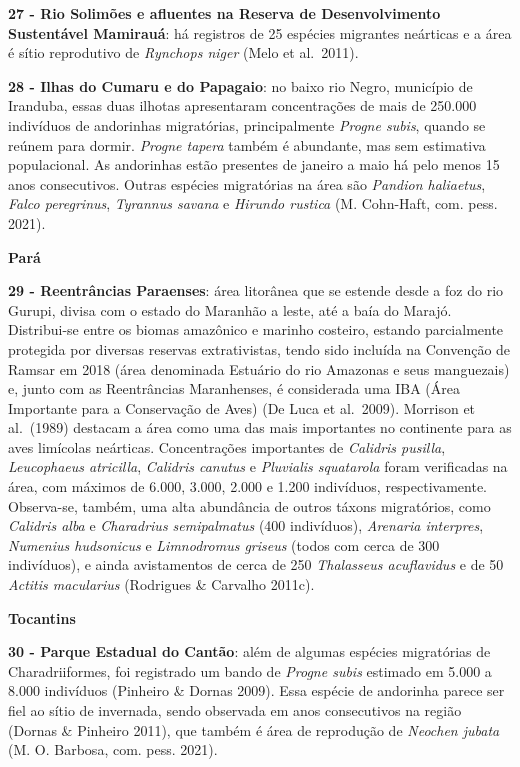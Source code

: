 \documentclass[
  oneside]{scrbook}
\begin{document}
\textbf{27 - Rio Solimões e afluentes na Reserva de Desenvolvimento Sustentável Mamirauá}: há registros de 25 espécies migrantes neárticas e a área é sítio reprodutivo de \emph{Rynchops niger} (Melo et al.~2011).

\textbf{28 - Ilhas do Cumaru e do Papagaio}: no baixo rio Negro, município de Iranduba, essas duas ilhotas apresentaram concentrações de mais de 250.000 indivíduos de andorinhas migratórias, principalmente \emph{Progne subis}, quando se reúnem para dormir. \emph{Progne tapera} também é abundante, mas sem estimativa populacional. As andorinhas estão presentes de janeiro a maio há pelo menos 15 anos consecutivos. Outras espécies migratórias na área são \emph{Pandion haliaetus}, \emph{Falco peregrinus}, \emph{Tyrannus savana} e \emph{Hirundo rustica} (M. Cohn-Haft, com. pess. 2021).

\textbf{Pará}

\textbf{29 - Reentrâncias Paraenses}: área litorânea que se estende desde a foz do rio Gurupi, divisa com o estado do Maranhão a leste, até a baía do Marajó. Distribui-se entre os biomas amazônico e marinho costeiro, estando parcialmente protegida por diversas reservas extrativistas, tendo sido incluída na Convenção de Ramsar em 2018 (área denominada Estuário do rio Amazonas e seus manguezais) e, junto com as Reentrâncias Maranhenses, é considerada uma IBA (Área Importante para a Conservação de Aves) (De Luca et al.~2009). Morrison et al.~(1989) destacam a área como uma das mais importantes no continente para as aves limícolas neárticas. Concentrações importantes de \emph{Calidris pusilla}, \emph{Leucophaeus atricilla}, \emph{Calidris canutus} e \emph{Pluvialis squatarola} foram verificadas na área, com máximos de 6.000, 3.000, 2.000 e 1.200 indivíduos, respectivamente. Observa-se, também, uma alta abundância de outros táxons migratórios, como \emph{Calidris alba} e \emph{Charadrius semipalmatus} (400 indivíduos), \emph{Arenaria interpres}, \emph{Numenius hudsonicus} e \emph{Limnodromus griseus} (todos com cerca de 300 indivíduos), e ainda avistamentos de cerca de 250 \emph{Thalasseus acuflavidus} e de 50 \emph{Actitis macularius} (Rodrigues \& Carvalho 2011c).

\textbf{Tocantins}

\textbf{30 - Parque Estadual do Cantão}: além de algumas espécies migratórias de Charadriiformes, foi registrado um bando de \emph{Progne subis} estimado em 5.000 a 8.000 indivíduos (Pinheiro \& Dornas 2009). Essa espécie de andorinha parece ser fiel ao sítio de invernada, sendo observada em anos consecutivos na região (Dornas \& Pinheiro 2011), que também é área de reprodução de \emph{Neochen jubata} (M. O. Barbosa, com. pess. 2021).
\end{document}
